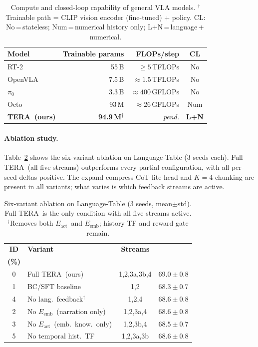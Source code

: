 \documentclass{article}
\newcommand{\modelname}{\textsc{TERA}\xspace}
\newcommand{\Lact}{$E_{\mathrm{act}}$\xspace}
\newcommand{\Lexp}{$E_{\mathrm{emb}}$\xspace}
\begin{document}
\begin{table}[h]
\caption{Compute and closed-loop capability of general VLA models.
  $^\dagger$Trainable path = CLIP vision encoder (fine-tuned) + policy.
  CL: No\,=\,stateless; Num\,=\,numerical history only; L+N\,=\,language\,+\,numerical.}
\label{tab:compute}
\centering
\small
\setlength{\tabcolsep}{5pt}
\begin{tabular}{lrrc}
\toprule
\textbf{Model} & \textbf{Trainable params} & \textbf{FLOPs/step} & \textbf{CL} \\
\midrule
RT-2        & 55\,B  & ${\geq}5$\,TFLOPs   & No  \\
OpenVLA     & 7.5\,B & ${\approx}1.5$\,TFLOPs & No  \\
$\pi_0$     & 3.3\,B & ${\approx}400$\,GFLOPs  & No  \\
Octo        & 93\,M  & ${\approx}26$\,GFLOPs   & Num \\
\midrule
\textbf{\modelname\ (ours)} & \textbf{94.9\,M}$^\dagger$ & \textit{pend.} & \textbf{L+N} \\
\bottomrule
\end{tabular}
\vspace{-4pt}
\end{table}

\paragraph{Ablation study.}
Table~\ref{tab:ablations} shows the six-variant ablation on Language-Table
(3 seeds each).
Full \modelname\ (all five streams) outperforms every partial configuration,
with all per-seed deltas positive.
The expand-compress CoT-lite head and $K{=}4$ chunking are present in all
variants; what varies is which feedback streams are active.

\begin{table}[h]
\centering
\caption{Six-variant ablation on Language-Table (3 seeds, mean$\pm$std).
  Full \modelname\ is the only condition with all five streams active.
  $^\dagger$Removes both \Lact\ and \Lexp; history TF and reward gate remain.}
\label{tab:ablations}
\small\setlength{\tabcolsep}{4pt}
\begin{tabular}{clcc}
\toprule
\textbf{ID} & \textbf{Variant} & \textbf{Streams}
            & \makecell{\textbf{LT Acc.}\\[-2pt]\textbf{(\%)}} \\
\midrule
0 & Full \modelname\ (ours)        & 1,2,3a,3b,4 & $\mathbf{69.0\pm0.8}$ \\
1 & BC/SFT baseline                & 1,2         & $68.3\pm0.7$ \\
4 & No lang.\ feedback$^\dagger$   & 1,2,4       & $68.6\pm0.8$ \\
2 & No \Lexp\ (narration only)     & 1,2,3a,4    & $68.6\pm0.8$ \\
3 & No \Lact\ (emb.\ know.\ only) & 1,2,3b,4    & $68.5\pm0.7$ \\
5 & No temporal hist.\ TF         & 1,2,3a,3b   & $68.6\pm0.8$ \\
\bottomrule
\end{tabular}
\end{table}
\end{document}
